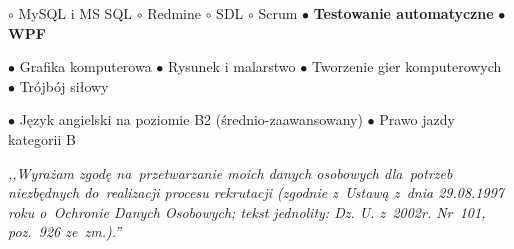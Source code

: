 \documentclass[11pt,a4paper]{article}
\begin{document}
    \vspace{0.04cm}
    $\circ$ MySQL i MS SQL
    \hspace{0.34cm}
    $\circ$ Redmine
    \hspace{0.34cm}
    $\circ$ SDL
    \hspace{0.34cm}
    $\circ$ Scrum
    \hspace{0.34cm}
    $\bullet$ {\bf Testowanie automatyczne}
    \hspace{0.34cm}
    $\bullet$ {\bf WPF}
  

    \bigskip
  
  
    \smallskip
    $\bullet$ Grafika komputerowa
    \hspace{0.34cm}
    $\bullet$ Rysunek i malarstwo
    \hspace{0.34cm}
    $\bullet$ Tworzenie gier komputerowych
    \hspace{0.34cm}
    $\bullet$ Trójbój siłowy
  

    \bigskip
  
  
    \smallskip
    $\bullet$ Język angielski na poziomie B2 (średnio-zaawansowany)
    \hspace{0.34cm}
    $\bullet$ Prawo jazdy kategorii B
  

    \vspace{1cm}
  
    \noindent \textit{,,Wyrażam zgodę na~przetwarzanie moich danych osobowych dla~potrzeb niezbędnych do~realizacji
    procesu rekrutacji (zgodnie z~Ustawą z~dnia 29.08.1997 roku o~Ochronie Danych Osobowych; tekst jednolity: Dz. U.
    z~2002r. Nr~101, poz.~926 ze~zm.).''}
\end{document}
